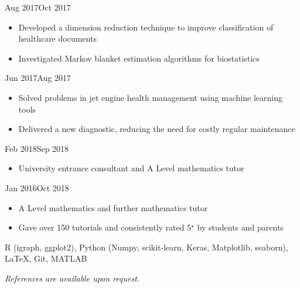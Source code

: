 \documentclass[
  date,
  number,
]{wgu-cv}
\begin{document}
{}
{Aug 2017}{Oct 2017}

\begin{itemize}
	\item Developed a dimension reduction technique to improve classification of healthcare documents
	\item Investigated Markov blanket estimation algorithms for biostatistics
\end{itemize}
	

{}
{Jun 2017}{Aug 2017}

\begin{itemize}
	\item Solved problems in jet engine health management using machine learning tools
	\item Delivered a new diagnostic, reducing the need for costly regular maintenance
\end{itemize}



{}
{Feb 2018}{Sep 2018}

\begin{itemize}
	\item University entrance consultant and A Level mathematics tutor
\end{itemize}


{}
{Jan 2016}{Oct 2018}

\begin{itemize}
	\item A Level mathematics and further mathematics tutor
	\item Gave over 150 tutorials and consistently rated 5$^\star$ by students and parents
\end{itemize}



R (igraph, ggplot2),
Python (Numpy, scikit-learn, Keras, Matplotlib, seaborn),
LaTeX,
Git,
MATLAB



\emph{References are available upon request.}
\end{document}
